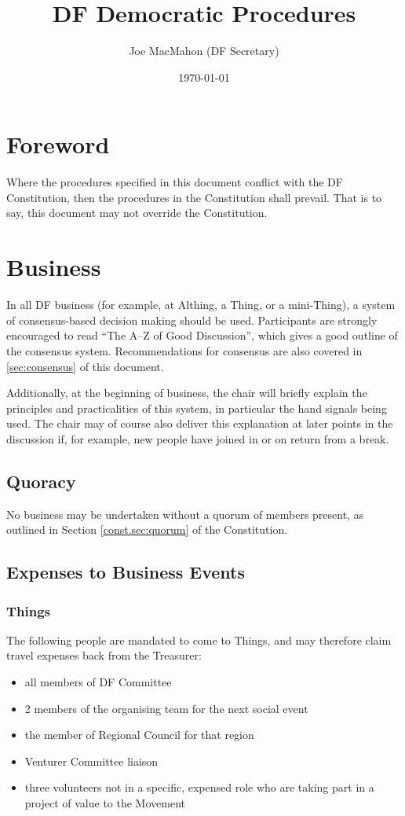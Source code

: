 \documentclass[a4paper, 11pt]{article} %
\title{DF Democratic Procedures}
\author{Joe MacMahon (DF Secretary)}
\date{\today}
\begin{document}
\maketitle

\tableofcontents

\section{Foreword}
Where the procedures specified in this document conflict with the DF Constitution, then the procedures in the Constitution shall prevail.  That is to say, this document may not override the Constitution.

\section{Business}
In all DF business (for example, at Althing, a Thing, or a mini-Thing), a system of consensus-based decision making should be used.  Participants are strongly encouraged to read ``The A--Z of Good Discussion'', which gives a good outline of the consensus system.  Recommendations for consensus are also covered in \autoref{sec:consensus} of this document.

Additionally, at the beginning of business, the chair will briefly explain the principles and practicalities of this system, in particular the hand signals being used.  The chair may of course also deliver this explanation at later points in the discussion if, for example, new people have joined in or on return from a break.

\subsection{Quoracy}
No business may be undertaken without a quorum of members present, as outlined in Section \ref{const.sec:quorum} of the Constitution.

\subsection{Expenses to Business Events}
\subsubsection{Things}
The following people are mandated to come to Things, and may therefore claim travel expenses back from the Treasurer:
\begin{itemize}
\item all members of DF Committee
\item 2 members of the organising team for the next social event
\item the member of Regional Council for that region
\item Venturer Committee liaison
\item three volunteers not in a specific, expensed role who are taking part in a project of value to the Movement
\end{itemize}
\end{document}
